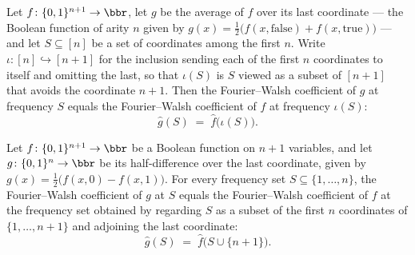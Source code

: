 \begin{lemma}
\label{BooleanAnalysis.Hypercontractivity.fourierCoeff_avgLast}
\leanok
{}
Let $f\colon\{0,1\}^{n+1}\to\bbr$, let $g$ be the average of $f$ over its
last coordinate — the Boolean function of arity $n$ given by $g(x) =
\tfrac12\bigl(f(x,\text{false}) + f(x,\text{true})\bigr)$ — and let $S \subseteq [n]$ be
a set of coordinates among the first $n$. Write $\iota\colon [n] \hookrightarrow [n+1]$
for the inclusion sending each of the first $n$ coordinates to itself and omitting the
last, so that $\iota(S)$ is $S$ viewed as a subset of $[n+1]$ that avoids the coordinate
$n+1$. Then the Fourier–Walsh coefficient of $g$ at frequency $S$ equals the
Fourier–Walsh coefficient of $f$ at frequency $\iota(S)$: \[ \hat g(S) \;=\; \hat
f\bigl(\iota(S)\bigr). \]
\end{lemma}

\begin{lemma}
\label{BooleanAnalysis.Hypercontractivity.fourierCoeff_diffLast}
\leanok
{}
Let $f\colon\{0,1\}^{n+1}\to\bbr$ be a Boolean function on $n+1$ variables, and let
$g\colon\{0,1\}^{n}\to\bbr$ be its half-difference over the last coordinate, given by
$g(x)=\tfrac12\bigl(f(x,0)-f(x,1)\bigr)$. For every frequency set
$S\subseteq\{1,\dots,n\}$, the Fourier--Walsh coefficient of $g$ at $S$ equals the
Fourier--Walsh coefficient of $f$ at the frequency set obtained by regarding $S$ as a
subset of the first $n$ coordinates of $\{1,\dots,n+1\}$ and adjoining the last
coordinate:
\[
  \hat g(S) \;=\; \hat f\bigl(S\cup\{n+1\}\bigr).
\]
\end{lemma}

